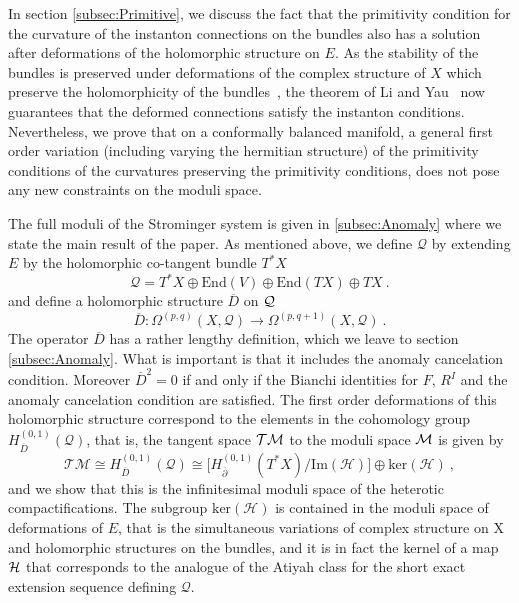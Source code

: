 \documentclass[12pt,a4paper]{article}
\def\bar#1{\overline{#1}}
\def\End{\textrm{End}}
\def\ker{\textrm{ker}}
\def\bp{\bar{\partial}}
\def\Q{\mathcal{Q}}
\def\H{\mathcal{H}}
\def\H{\mathcal{H}}
\theoremstyle{definition}
\begin{document}
In section \ref{subsec:Primitive}, we discuss the fact that the primitivity condition for the curvature of the instanton connections on the bundles also has a solution after deformations of the holomorphic structure on $E$. As the stability of the bundles is preserved under deformations of the complex structure of $X$ which preserve the holomorphicity of the bundles~\citep{MR2665168},  the theorem of Li and Yau~\citep{MR915839} now guarantees that the deformed connections satisfy the instanton conditions. Nevertheless, we prove that on a conformally balanced manifold, a general first order variation (including varying the hermitian structure) of the primitivity conditions of the curvatures preserving the primitivity conditions, does not pose  any new constraints on the moduli space. 

 The full moduli of the Strominger system is given in \ref{subsec:Anomaly} where we state the main result of the paper.
As mentioned above, we define $\Q$ by extending $E$ by the holomorphic co-tangent bundle $T^*X$
 \begin{equation*}
\Q=T^*X\oplus\End(V)\oplus\End(TX)\oplus TX\:.
\end{equation*}
and define a holomorphic structure $\bar D$  on $\cal Q$
\begin{equation*}
\bar D:\Omega^{(p,q)}(X,\Q)\rightarrow\Omega^{(p,q+1)}(X,\Q)\:.
\end{equation*}
The operator $\bar D$ has a rather lengthy definition, which we leave to section \ref{subsec:Anomaly}. What is important is that  
 it includes the anomaly cancelation condition.  Moreover $\bar D^2 = 0$ if and only if the Bianchi identities for $F$, $R^I$ and the anomaly cancelation condition are satisfied.  
The first order deformations of this holomorphic structure correspond to the elements in the cohomology group $H^{(0,1)}_{\bar D}(\Q)$, that is, the tangent space $\cal TM$ to the moduli space $\cal M$ is given by 
\begin{equation*}
\mathcal{T M}\cong H^{(0,1)}_{\bar D}(\Q)\cong  \Big[H^{(0,1)}_{\bp}(T^*X)\Big/\textrm{Im}(\H)\Big]\oplus\ker(\H)\:,
\end{equation*}
and we show that this is the infinitesimal moduli space of the heterotic compactifications. The subgroup $\ker(\H)$ is contained in the moduli space of deformations of $E$, that is the simultaneous variations of complex structure on X and holomorphic structures on the bundles, and it is in fact the kernel of a map $\cal H$ that corresponds to the analogue of the Atiyah class  for the  short exact extension sequence defining $\Q$.
\end{document}
